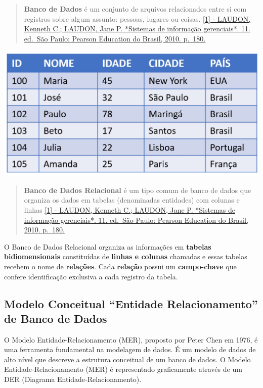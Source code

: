 \documentclass[
]{book}
\begin{document}
\begin{quote}
\textbf{Banco de Dados} é um conjunto de arquivos relacionados entre si com registros sobre algum assunto: pessoas, lugares ou coisas. \hyperref[laudon-kenneth-c.-laudon-jane-p.-sistemas-de-informauxe7uxe3o-gerenciais.-11.-ed.-suxe3o-paulo-pearson-education-do-brasil-2010.-p.-180.]{{[}1{]} - LAUDON, Kenneth C.; LAUDON, Jane P. *Sistemas de informação gerenciais*. 11. ed.~São Paulo: Pearson Education do Brasil, 2010. p.~180.}
\end{quote}

\includegraphics{images/5-bi/07-tabela_relacional.jpg}

\begin{quote}
\textbf{Banco de Dados Relacional} é um tipo comum de banco de dados que organiza os dados em tabelas (denominadas entidades) com colunas e linhas \hyperref[laudon-kenneth-c.-laudon-jane-p.-sistemas-de-informauxe7uxe3o-gerenciais.-11.-ed.-suxe3o-paulo-pearson-education-do-brasil-2010.-p.-180.]{{[}1{]} - LAUDON, Kenneth C.; LAUDON, Jane P. *Sistemas de informação gerenciais*. 11. ed.~São Paulo: Pearson Education do Brasil, 2010. p.~180.}
\end{quote}

O Banco de Dados Relacional organiza as informações em \textbf{tabelas bidiomensionais} constituídas de \textbf{linhas e colunas} chamadas e essas tabelas recebem o nome de \textbf{relações}. Cada \textbf{relação} possui um \textbf{campo-chave} que confere identificação exclusiva a cada registro da tabela.

\subsection{Modelo Conceitual ``Entidade Relacionamento'' de Banco de Dados}\label{modelo-conceitual-entidade-relacionamento-de-banco-de-dados}

O Modelo Entidade-Relacionamento (MER), proposto por Peter Chen em 1976, é uma ferramenta fundamental na modelagem de dados. É um modelo de dados de alto nível que descreve a estrutura conceitual de um banco de dados. O Modelo Entidade-Relacionamento (MER) é representado graficamente através de um DER (Diagrama Entidade-Relacionamento).
\end{document}
